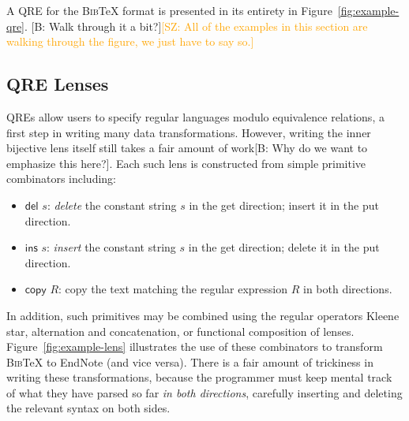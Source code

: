 \documentclass[acmsmall,review,anonymous]{acmart}
\newcommand{\FINISH}[3]{\ifdraft\textcolor{#1}{[#2: #3]}\fi}
\newcommand{\bcp}[1]{\FINISH{dkred}{B}{#1}}
\newcommand{\saz}[1]{\FINISH{orange}{SZ}{#1}}
\newcommand{\kw}[1]{\ensuremath{\mathsf{#1}}}
\newcommand{\bibtex}{\textsc{Bib}\TeX{}}
\begin{document}


A QRE for the \bibtex{} format is presented in its
entirety in Figure~\ref{fig:example-qre}. \bcp{Walk through it a bit?}\saz{All of the
  examples in this section are walking through the figure, we just have to say so.}

\subsection{QRE Lenses}
QREs allow users to specify regular languages modulo equivalence relations,
a first step in writing many data transformations.  However, writing the
inner bijective lens itself still takes a fair amount of work\bcp{Why do we
  want to emphasize this here?}.  Each such lens
is constructed from simple primitive combinators including:
%
\begin{itemize}
  \item \kw{del} $s$: \textit{delete} the constant string $s$ in the get direction;
  insert it in the put direction.
  \item \kw{ins} $s$: \textit{insert} the constant string $s$ in the get direction;
  delete it in the put direction.
  \item \kw{copy} $R$: copy the text matching the regular expression $R$ in both
  directions.
\end{itemize}
In addition, such primitives may be combined using the regular operators
Kleene star, alternation and concatenation, or functional composition of
lenses.  Figure~\ref{fig:example-lens} illustrates the use of these
combinators to transform \bibtex{} to EndNote (and vice versa).
There is a fair amount of trickiness in writing these transformations, because
the programmer must keep mental track of what they have parsed so far \emph{in both
directions}, carefully inserting and deleting the relevant syntax on both
sides.
\end{document}
